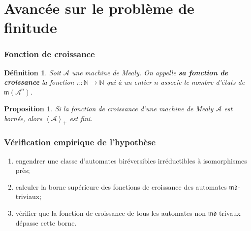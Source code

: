 \documentclass[11pt]{beamer}
\newtheorem{prop}{Proposition}
\newtheorem{defi}{Définition}
\begin{document}
\section{Avancée sur le problème de finitude}

\begin{frame}
  \frametitle{Fonction de croissance}

  \begin{defi} %
    Soit $\mathcal{A}$ une machine de Mealy. On appelle \textbf{\textit{sa fonction de croissance}} la fonction $\pi:\mathbb{N}\rightarrow\mathbb{N}$ qui à un entier $n$ associe le nombre d'états de~$\mathfrak{m}\left(\mathcal{A}^n\right)$.
  \end{defi}

  \begin{prop} %
    Si la fonction de croissance d'une machine de Mealy $\mathcal{A}$ est bornée, alors $\left<\mathcal{A}\right>_+$ est fini.
  \end{prop}
\end{frame}

\begin{frame}
  \frametitle{Vérification empirique de l'hypothèse}

  \begin{enumerate}
  \item engendrer une classe d'automates biréversibles irréductibles à isomorphismes près;
  \item calculer la borne supérieure des fonctions de croissance des automates $\mathfrak{md}$-triviaux;
  \item vérifier que la fonction de croissance de tous les automates non $\mathfrak{md}$-trivaux dépasse cette borne.
  \end{enumerate}
\end{frame}
\end{document}
